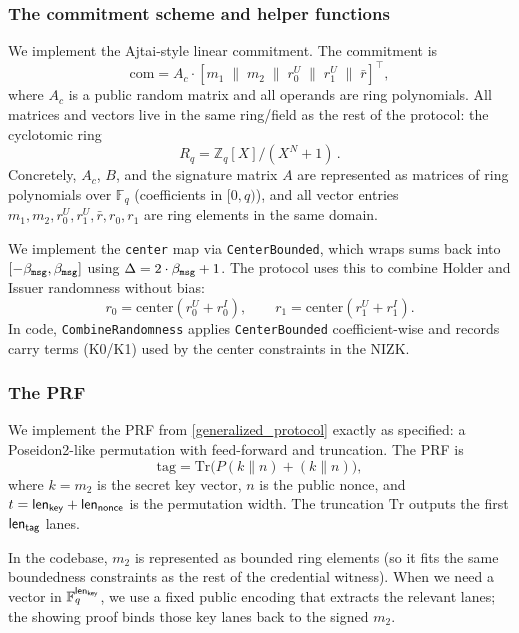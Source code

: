 \subsubsection{The commitment scheme and helper functions}
We implement the Ajtai-style linear commitment. The commitment is
\[
\mathrm{com}=A_c\cdot[m_1\;\|\;m_2\;\|\;r^U_0\;\|\;r^U_1\;\|\;\bar r]^\top,
\]
where $A_c$ is a public random matrix and all operands are ring polynomials.
All matrices and vectors live in the same ring/field as the rest of the protocol: the cyclotomic ring
\[
R_q=\mathbb{Z}_q[X]/(X^N+1)\,.
\]
Concretely, $A_c$, $B$, and the signature matrix $A$ are represented as matrices of ring polynomials over $\mathbb{F}_q$
(coefficients in $[0,q)$), and all vector entries $m_1,m_2,r^U_0,r^U_1,\bar r,r_0,r_1$ are ring elements in the same
domain.


We implement the \texttt{center} map via \texttt{CenterBounded}, which wraps sums back into
$[-\beta_{\mathtt{msg}},\beta_{\mathtt{msg}}]$ using $\Delta=2\cdot\beta_{\mathtt{msg}}+1$. The protocol uses this to combine Holder
and Issuer randomness without bias:
\[
r_0=\mathrm{center}(r^U_0+r^I_0),\qquad r_1=\mathrm{center}(r^U_1+r^I_1).
\]
In code, \texttt{CombineRandomness} applies \texttt{CenterBounded} coefficient-wise and records carry terms (K0/K1) used
by the center constraints in the NIZK.
\subsubsection{The PRF}
We implement the PRF from \ref{generalized_protocol} exactly as specified: a Poseidon2-like permutation with
feed-forward and truncation. The PRF is
\[
\mathrm{tag}=\mathrm{Tr}\big(P(k\|n)+ (k\|n)\big),
\]
where $k=m_2$ is the secret key vector, $n$ is the public nonce, and $t=\mathsf{len}_{\mathsf{key}}+\mathsf{len}_{\mathsf{nonce}}$ is the permutation width.
The truncation $\mathrm{Tr}$ outputs the first $\mathsf{len}_{\mathsf{tag}}$ lanes.

In the codebase, $m_2$ is represented as bounded ring elements (so it fits the same boundedness constraints as the rest
of the credential witness). When we need a vector in $\mathbb{F}_q^{\mathsf{len}_{\mathsf{key}}}$, we use a fixed public encoding that
extracts the relevant lanes; the showing proof binds those key lanes back to the signed $m_2$.

